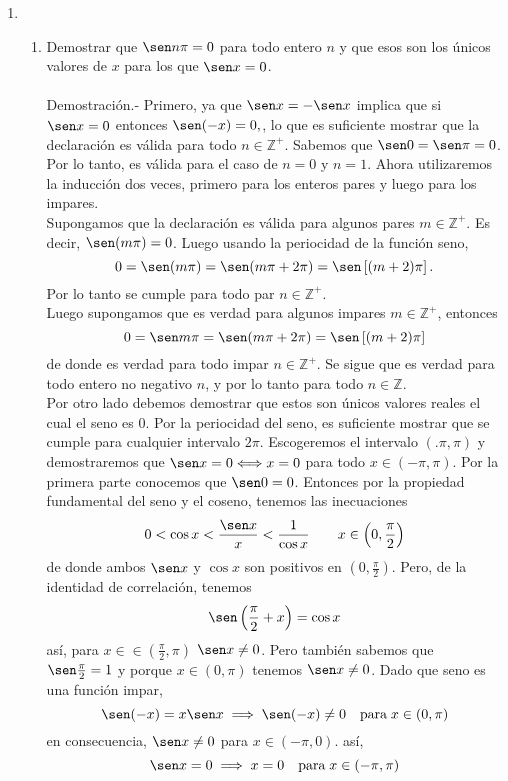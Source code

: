 \begin{enumerate}[\bfseries 1.]

\item 
\begin{enumerate}{\bfseries (a)}

    \item Demostrar que $\sen n\pi =0$ para todo entero $n$ y que esos son los únicos valores de $x$ para los que $\sen x = 0$.\\\\
	Demostración.-\; Primero, ya que $\sen x = -\sen x$ implica que si $\sen x = 0$ entonces $\sen(-x)=0,$, lo que es suficiente mostrar que la declaración es válida para todo $n \in \mathbb{Z}^+$. Sabemos que $\sen 0 = \sen \pi = 0$. Por lo tanto, es válida para el caso de $n=0$ y $n=1$. Ahora utilizaremos la inducción dos veces, primero para los enteros pares y luego para los impares.\\
	Supongamos que la declaración es válida para algunos pares $m\in \mathbb{Z}^+$. Es decir, $\sen(m\pi)=0$. Luego usando la periocidad de la función seno, $$0=\sen(m\pi)=\sen(m\pi + 2\pi)=\sen\left[(m+2)\pi\right].$$  
	Por lo tanto se cumple para todo par $n\in \mathbb{Z}^+$.\\
	Luego supongamos que es verdad para algunos impares $m\in \mathbb{Z}^+$, entonces $$0=\sen m\pi = \sen(m\pi+2\pi)=\sen\left[(m+2)\pi\right]$$
	de donde es verdad para todo impar $n\in \mathbb{Z}^+$. Se sigue que es verdad para todo entero no negativo $n$, y por lo tanto para todo $n\in \mathbb{Z}$.\\
	Por otro lado debemos demostrar que estos son únicos valores reales el cual el seno es $0$. Por la periocidad del seno, es suficiente mostrar que se cumple para cualquier intervalo $2\pi$. Escogeremos el intervalo $(.\pi,\pi)$ y demostraremos que $\sen x=0 \Longleftrightarrow x=0$ para todo $x\in (-\pi,\pi)$. Por la primera parte conocemos que $\sen 0 = 0$. Entonces por la propiedad fundamental del seno y el coseno, tenemos las inecuaciones $$0<\cos x <\dfrac{\sen x}{x}<\dfrac{1}{\cos x} \qquad x\in \left(0,\dfrac{\pi}{2}\right)$$
	de donde ambos $\sen x$ y $\cos x$ son positivos en $\left(0,\frac{\pi}{2}\right)$. Pero, de la identidad de correlación, tenemos 
	$$\sen\left(\dfrac{\pi}{2}+x\right)=\cos x$$
	así, para $x\in \in (\frac{\pi}{2},\pi)$ $\sen x \neq 0$. Pero también sabemos que $\sen\frac{\pi}{2}=1$ y porque $x\in (0,\pi)$ tenemos $\sen x\neq 0$. Dado que seno es una función impar, $$\sen(-x)=x\sen x \; \Longrightarrow \; \sen(-x)\neq 0 \quad \mbox{para}\; x \in (0,\pi)$$
	en consecuencia, $\sen x\neq 0$ para $x\in (-\pi,0).$ así, $$\sen x=0 \; \Longrightarrow \; x=0 \quad \mbox{para}\; x\in (-\pi,\pi)$$\\


\end{enumerate}
\end{enumerate}
